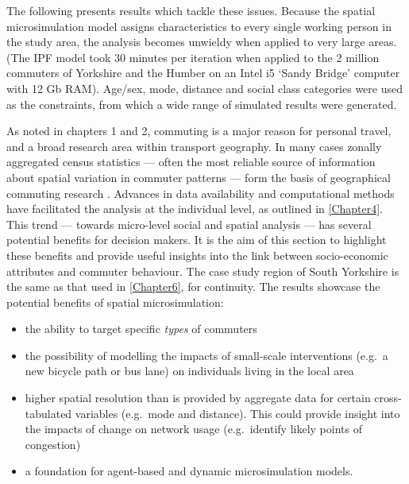 The following presents results which tackle these issues.
Because the spatial microsimulation model assigns characteristics to every single
working person in the study area, the analysis becomes unwieldy when applied to
very large areas. (The IPF model took 30 minutes per iteration when applied
to the 2 million commuters of Yorkshire and the Humber on an Intel i5 `Sandy
Bridge' computer with 12 Gb RAM). Age/sex, mode,
distance and social class categories were used as the constraints, from which
a wide range of simulated results were generated.

As noted in chapters 1 and 2, commuting is a major reason for personal travel,
and a broad research area within transport geography. In many cases zonally
aggregated census statistics --- often the most reliable source of
information about spatial variation in commuter patterns --- form the basis of
geographical commuting research
\citep{Horner2002,Titheridge2006}.
Advances in data availability
and computational methods  have facilitated
the analysis at the individual level, as outlined in \cref{Chapter4}.
This trend --- towards micro-level social and spatial analysis
--- has several potential benefits
for decision makers. It is the aim of this section to highlight these benefits
and provide useful insights into the link between socio-economic attributes
and commuter behaviour. The case study region of South Yorkshire is the same
as that used in \cref{Chapter6}, for continuity. The results showcase the
potential benefits of spatial microsimulation:
\begin{itemize}
 \item the ability to target specific \emph{types} of commuters
\item the possibility of modelling the impacts of small-scale interventions
(e.g.~a new bicycle path or bus lane) on individuals living in the local area
\item higher spatial resolution than is provided by aggregate data for certain
cross-tabulated variables (e.g.~mode and distance). This could provide insight
into the impacts of change on network usage (e.g.~identify likely points of
congestion)
\item a foundation for agent-based and dynamic microsimulation models.
\end{itemize}

